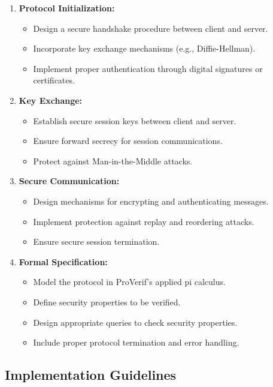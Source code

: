 \documentclass[10pt,a4paper,american]{article}
\begin{document}
\begin{enumerate}
	\item \textbf{Protocol Initialization:}
	      \begin{itemize}
		      \item Design a secure handshake procedure between client and server.
		      \item Incorporate key exchange mechanisms (e.g., Diffie-Hellman).
		      \item Implement proper authentication through digital signatures or certificates.
	      \end{itemize}

	\item \textbf{Key Exchange:}
	      \begin{itemize}
		      \item Establish secure session keys between client and server.
		      \item Ensure forward secrecy for session communications.
		      \item Protect against Man-in-the-Middle attacks.
	      \end{itemize}

	\item \textbf{Secure Communication:}
	      \begin{itemize}
		      \item Design mechanisms for encrypting and authenticating messages.
		      \item Implement protection against replay and reordering attacks.
		      \item Ensure secure session termination.
	      \end{itemize}

	\item \textbf{Formal Specification:}
	      \begin{itemize}
		      \item Model the protocol in ProVerif's applied pi calculus.
		      \item Define security properties to be verified.
		      \item Design appropriate queries to check security properties.
		      \item Include proper protocol termination and error handling.
	      \end{itemize}
\end{enumerate}

\subsection*{Implementation Guidelines}
\end{document}
